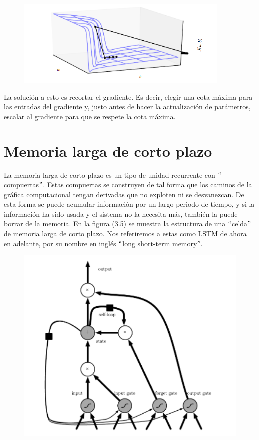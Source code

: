 \begin{figure}[h]
\begin{center}
\includegraphics{./imag/clipping.png}
\end{center}
\caption{}
\end{figure}

La solución a esto es recortar el gradiente. Es decir, elegir una cota máxima para las entradas del gradiente y, justo antes de hacer la actualización de parámetros, escalar al gradiente para que se respete la cota máxima.
\cite{goodfellow-et-al-2016}
\cite{DBLP:journals/corr/Graves13}
\cite{DBLP:journals/corr/abs-1211-5063}

\section{Memoria larga de corto plazo}
La memoria larga de corto plazo es un tipo de unidad recurrente con $``$compuertas$"$. Estas compuertas se construyen de tal forma que los caminos de la gráfica computacional tengan derivadas que no exploten ni se desvanezcan. De esta forma se puede acumular información por un largo periodo de tiempo, y si la información ha sido usada y el sistema no la necesita más, también la puede borrar de la memoria. En la figura (3.5) se muestra la estructura de una $``$celda$"$ de memoria larga de corto plazo. Nos referiremos a estas como LSTM de ahora en adelante, por su nombre en inglés $``$long short-term memory$''$.
\cite{Gers:2000}
\cite{goodfellow-et-al-2016}
\cite{Hochreiter:1997:LSM:1246443.1246450}


\begin{figure}[h]
\begin{center}
\includegraphics{./imag/lstm.png}
\end{center}
\caption{}
\end{figure}

